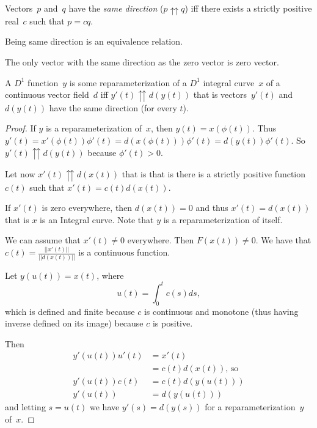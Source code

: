 \begin{defn}
Vectors~$p$ and~$q$ have the \emph{same direction} ($p\upuparrows q$) iff there exists a strictly positive real~$c$ such that $p=cq$.
\end{defn}

\begin{obvious}
Being same direction is an equivalence relation.
\end{obvious}

\begin{obvious}
The only vector with the same direction as the zero vector is zero vector.
\end{obvious}

\begin{thm}
A $D^1$ function~$y$ is some reparameterization of a $D^1$ integral curve~$x$ of a continuous vector field~$d$ iff
$y'(t)\upuparrows d(y(t))$ that is vectors~$y'(t)$ and $d(y(t))$ have the same direction (for every $t$).
\end{thm}

\begin{proof}
If $y$ is a reparameterization of~$x$, then $y(t)=x(\phi(t))$. Thus $y'(t)=x'(\phi(t))\phi'(t)=d(x(\phi(t)))\phi'(t)=d(y(t))\phi'(t)$.
So $y'(t)\upuparrows d(y(t))$ because $\phi'(t)>0$.

Let now $x'(t)\upuparrows d(x(t))$ that is that is there is a strictly positive function $c(t)$ such that
$x'(t) = c(t) d(x(t))$.

If $x'(t)$ is zero everywhere, then $d(x(t))=0$ and thus $x'(t)=d(x(t))$ that is $x$ is an Integral curve.
Note that $y$ is a reparameterization of itself.

We can assume that $x'(t)\ne 0$ everywhere. Then $F(x(t))\ne 0$. We have
that $c(t) = \frac{||x'(t)||}{||d(x(t))||}$ is a continuous function. 

Let $y(u(t)) = x(t)$, where \[ u(t)=\int_0^t c(s)ds, \]
which is defined and finite because $c$ is continuous and monotone (thus having inverse defined on its image)
because $c$ is positive.

Then
\begin{align*}
y'(u(t)) u'(t) &= x'(t) \\
&= c(t) d(x(t)) \text{, so}\\
y'(u(t)) c(t) &= c(t) d(y(u(t))) \\
y'(u(t))  &=  d(y(u(t)))
\end{align*}
and letting $s=u(t)$ we have $y'(s)=d(y(s))$ for a reparameterization~$y$ of~$x$.
\end{proof}

